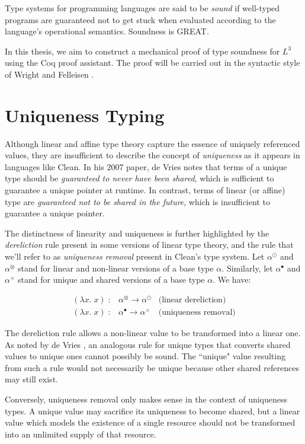 \documentclass[]{unswthesis}
\let\i\textit
\begin{document}
Type systems for programming languages are said to be \i{sound} if well-typed programs are guaranteed not to get stuck when evaluated according to the language's operational semantics. Soundness is GREAT.

In this thesis, we aim to construct a mechanical proof of type soundness for $L^3$ using the Coq proof assistant. The proof will be carried out in the syntactic style of Wright and Felleisen \cite{wright94}.

\section{Uniqueness Typing}

Although linear and affine type theory capture the essence of uniquely referenced values, they are insufficient to describe the concept of \i{uniqueness} as it appears in languages like Clean. In his 2007 paper, de Vries \cite{deVries07} notes that terms of a unique type should be \i{guaranteed to never have been shared}, which is sufficient to guarantee a unique pointer at runtime. In contrast, terms of linear (or affine) type are \i{guaranteed not to be shared in the future}, which is insufficient to guarantee a unique pointer.

The distinctness of linearity and uniqueness is further highlighted by the \i{dereliction} rule present in some versions of linear type theory, and the rule that we'll refer to as \i{uniqueness removal} present in Clean's type system. Let $\alpha^\odot$ and $\alpha^\otimes$ stand for linear and non-linear versions of a base type $\alpha$. Similarly, let $\alpha^\bullet$ and $\alpha^\times$ stand for unique and shared versions of a base type $\alpha$. We have:

\begin{eqnarray*}
(\lambda x. \; x) \; : & \alpha^\otimes \rightarrow \alpha^\odot & \text{(linear dereliction)}\\
(\lambda x. \; x) \; : & \alpha^\bullet \rightarrow \alpha^\times & \text{(uniqueness removal)}
\end{eqnarray*}

The dereliction rule allows a non-linear value to be transformed into a linear one. As noted by de Vries \cite{deVriesPhD08}, an analogous rule for unique types that converts shared values to unique ones cannot possibly be sound. The ``unique" value resulting from such a rule would not necessarily be unique because other shared references may still exist.

Conversely, uniqueness removal only makes sense in the context of uniqueness types. A unique value may sacrifice its uniqueness to become shared, but a linear value which models the existence of a single resource should not be transformed into an unlimited supply of that resource.
\end{document}
